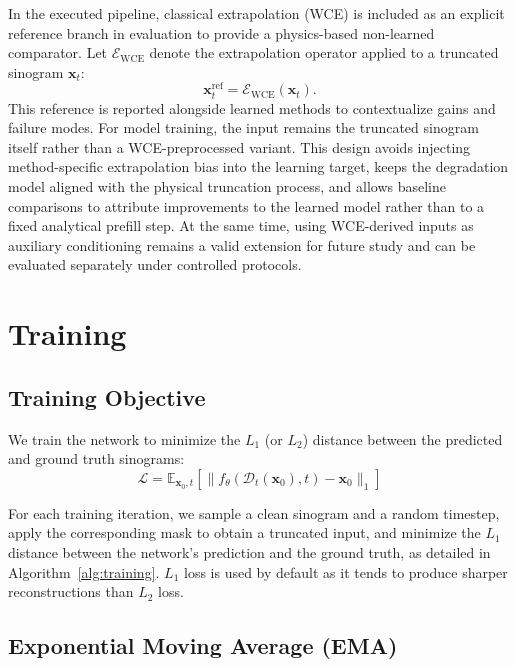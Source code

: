 In the executed pipeline, classical extrapolation (WCE) is included as an explicit reference branch in evaluation to provide a physics-based non-learned comparator. Let $\mathcal{E}_{\text{WCE}}$ denote the extrapolation operator applied to a truncated sinogram $\mathbf{x}_t$:
\begin{equation}
\mathbf{x}^{\text{ref}}_t = \mathcal{E}_{\text{WCE}}(\mathbf{x}_t).
\end{equation}
This reference is reported alongside learned methods to contextualize gains and failure modes. For model training, the input remains the truncated sinogram itself rather than a WCE-preprocessed variant. This design avoids injecting method-specific extrapolation bias into the learning target, keeps the degradation model aligned with the physical truncation process, and allows baseline comparisons to attribute improvements to the learned model rather than to a fixed analytical prefill step. At the same time, using WCE-derived inputs as auxiliary conditioning remains a valid extension for future study and can be evaluated separately under controlled protocols.

\section{Training}

\subsection{Training Objective}

We train the network to minimize the $L_1$ (or $L_2$) distance between the predicted and ground truth sinograms:
%
\begin{equation}
\mathcal{L} = \mathbb{E}_{\mathbf{x}_0, t} \left[ \| f_\theta(\mathcal{D}_t(\mathbf{x}_0), t) - \mathbf{x}_0 \|_1 \right]
\label{eq:training_loss}
\end{equation}

For each training iteration, we sample a clean sinogram and a random timestep, apply the corresponding mask to obtain a truncated input, and minimize the $L_1$ distance between the network's prediction and the ground truth, as detailed in Algorithm~\ref{alg:training}. $L_1$ loss is used by default as it tends to produce sharper reconstructions than $L_2$ loss.

\subsection{Exponential Moving Average (EMA)}

